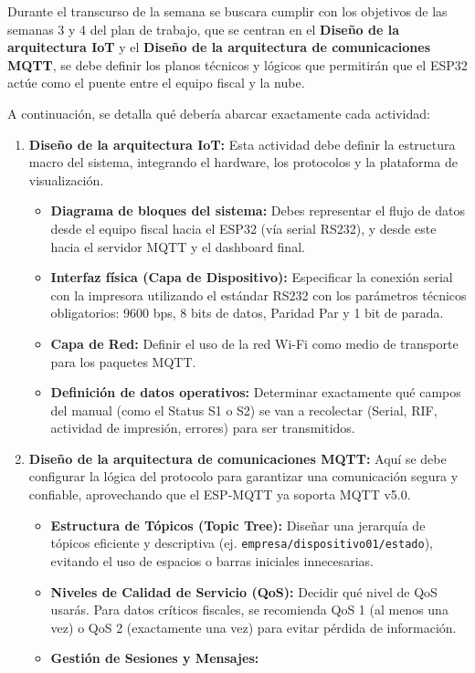 \documentclass[12pt, a4paper]{article}
\begin{document}
    Durante el transcurso de la semana se buscara cumplir con los objetivos de las semanas 3 y 4 del plan de trabajo, que se centran en el \textbf{Diseño de la arquitectura IoT} y el \textbf{Diseño de la arquitectura de comunicaciones MQTT}, se debe definir los planos técnicos y lógicos que permitirán que el ESP32 actúe como el puente entre el equipo fiscal y la nube.

    A continuación, se detalla qué debería abarcar exactamente cada actividad:

    \begin{enumerate}
        \item \textbf{Diseño de la arquitectura IoT:} Esta actividad debe definir la estructura macro del sistema, integrando el hardware, los protocolos y la plataforma de visualización.

        \begin{itemize}
            \item \textbf{Diagrama de bloques del sistema:} Debes representar el flujo de datos desde el equipo fiscal hacia el ESP32 (vía serial RS232), y desde este hacia el servidor MQTT y el dashboard final.
            \item \textbf{Interfaz física (Capa de Dispositivo):} Especificar la conexión serial con la impresora utilizando el estándar RS232 con los parámetros técnicos obligatorios: 9600 bps, 8 bits de datos, Paridad Par y 1 bit de parada.
            \item \textbf{Capa de Red:} Definir el uso de la red Wi-Fi como medio de transporte para los paquetes MQTT.
            \item \textbf{Definición de datos operativos:} Determinar exactamente qué campos del manual (como el Status S1 o S2) se van a recolectar (Serial, RIF, actividad de impresión, errores) para ser transmitidos.
        \end{itemize}

        \item \textbf{Diseño de la arquitectura de comunicaciones MQTT:} Aquí se debe configurar la lógica del protocolo para garantizar una comunicación segura y confiable, aprovechando que el ESP-MQTT ya soporta MQTT v5.0.

        \begin{itemize}
            \item \textbf{Estructura de Tópicos (Topic Tree):} Diseñar una jerarquía de tópicos eficiente y descriptiva (ej. \texttt{empresa/dispositivo01/estado}), evitando el uso de espacios o barras iniciales innecesarias.
            \item \textbf{Niveles de Calidad de Servicio (QoS):} Decidir qué nivel de QoS usarás. Para datos críticos fiscales, se recomienda QoS 1 (al menos una vez) o QoS 2 (exactamente una vez) para evitar pérdida de información.
            \item \textbf{Gestión de Sesiones y Mensajes:}


\end{itemize}
\end{enumerate}
\end{document}
